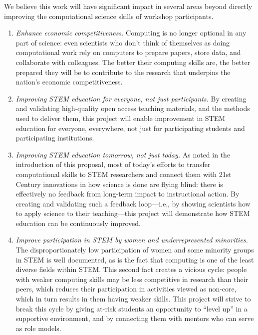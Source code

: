 \documentclass{proposalnsf}
\newlength{\up}
\begin{document}
We believe this work will have significant impact in several areas
beyond directly improving the computational science skills of workshop
participants.

\begin{enumerate}

\item
  \emph{Enhance economic competitiveness.} Computing is no longer
  optional in any part of science: even scientists who don't think of
  themselves as doing computational work rely on computers to prepare
  papers, store data, and collaborate with colleagues.  The better
  their computing skills are, the better prepared they will be to
  contribute to the research that underpins the nation's economic
  competitiveness.

\item
  \emph{Improving STEM education for everyone, not just participants.}
  By creating and validating high-quality open access teaching
  materials, and the methods used to deliver them, this project will
  enable improvement in STEM education for everyone, everywhere, not
  just for participating students and participating institutions.

\item
  \emph{Improving STEM education tomorrow, not just today.}  As noted
  in the introduction of this proposal, most of today's efforts to
  transfer computational skills to STEM researchers and connect them
  with 21st Century innovations in how science is done are flying
  blind: there is effectively no feedback from long-term impact to
  instructional action.  By creating and validating such a feedback
  loop---i.e., by showing scientists how to apply science to their
  teaching---this project will demonstrate how STEM education can be
  continuously improved.

\item
  \emph{Improve participation in STEM by women and underrepresented
    minorities.} The disproportionately low participation of women and
  some minority groups in STEM is well documented, as is the fact that
  computing is one of the least diverse fields within STEM.  This
  second fact creates a vicious cycle: people with weaker computing
  skills may be less competitive in research than their peers, which
  reduces their participation in activities viewed as non-core, which
  in turn results in them having weaker skills.  This project will
  strive to break this cycle by giving at-risk students an opportunity
  to ``level up'' in a supportive environment, and by connecting them
  with mentors who can serve as role models.

\end{enumerate}
\end{document}
